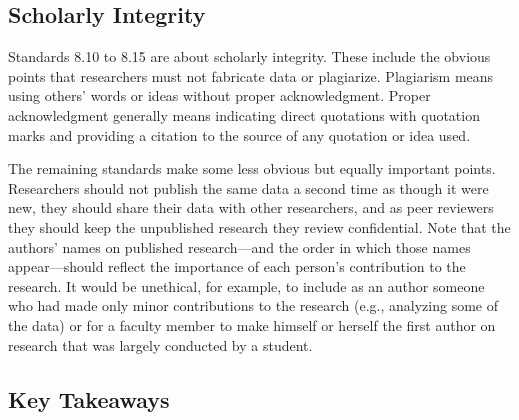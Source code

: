 \subsection{Scholarly Integrity}


Standards 8.10 to 8.15 are about scholarly integrity. These include the obvious points that researchers must not fabricate data or plagiarize. Plagiarism means using others' words or ideas without proper acknowledgment. Proper acknowledgment generally means indicating direct quotations with quotation marks and providing a citation to the source of any quotation or idea used.


The remaining standards make some less obvious but equally important points. Researchers should not publish the same data a second time as though it were new, they should share their data with other researchers, and as peer reviewers they should keep the unpublished research they review confidential. Note that the authors' names on published research---and the order in which those names appear---should reflect the importance of each person's contribution to the research. It would be unethical, for example, to include as an author someone who had made only minor contributions to the research (e.g., analyzing some of the data) or for a faculty member to make himself or herself the first author on research that was largely conducted by a student.


\subsection{Key Takeaways}

